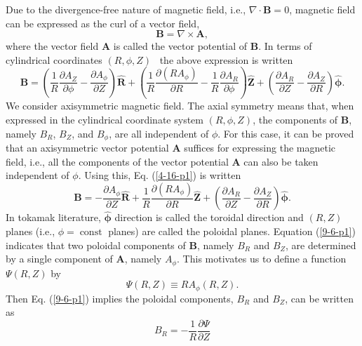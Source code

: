\documentclass{article}
\newcommand{\tmmathbf}[1]{\ensuremath{\boldsymbol{#1}}}
\newcommand{\tmop}[1]{\ensuremath{\operatorname{#1}}}
\begin{document}
Due to the divergence-free nature of magnetic field, i.e., $\nabla \cdot
\mathbf{B}= 0$, magnetic field can be expressed as the curl of a vector field,
\begin{equation}
  \mathbf{B}= \nabla \times \mathbf{A},
\end{equation}
where the vector field $\mathbf{A}$ is called the vector potential of
$\mathbf{B}$. In terms of cylindrical coordinates $(R, \phi, Z)$ \ the above
expression is written
\begin{equation}
  \label{4-16-p1} \mathbf{B}= \left( \frac{1}{R} \frac{\partial A_Z}{\partial
  \phi} - \frac{\partial A_{\phi}}{\partial Z} \right) \hat{\mathbf{R}} +
  \left( \frac{1}{R} \frac{\partial (R A_{\phi})}{\partial R} - \frac{1}{R}
  \frac{\partial A_R}{\partial \phi} \right) \hat{\mathbf{Z}} + \left(
  \frac{\partial A_R}{\partial Z} - \frac{\partial A_Z}{\partial R} \right)
  \hat{\tmmathbf{\phi}} .
\end{equation}
We consider axisymmetric magnetic field. The axial symmetry means that, when
expressed in the cylindrical coordinate system $(R, \phi, Z)$, the components
of $\mathbf{B}$, namely $B_R$, $B_Z$, and $B_{\phi}$, are all independent of
$\phi$. For this case, it can be proved that an axisymmetric vector potential
$\mathbf{A}$ suffices for expressing the magnetic field, i.e., all the
components of the vector potential $\mathbf{A}$ can also be taken independent
of $\phi$. Using this, Eq. (\ref{4-16-p1}) is written
\begin{equation}
  \label{9-6-p1} \mathbf{B}= - \frac{\partial A_{\phi}}{\partial Z}
  \hat{\mathbf{R}} + \frac{1}{R} \frac{\partial (R A_{\phi})}{\partial R}
  \hat{\mathbf{Z}} + \left( \frac{\partial A_R}{\partial Z} - \frac{\partial
  A_Z}{\partial R} \right) \hat{\tmmathbf{\phi}} .
\end{equation}
In tokamak literature, $\hat{\tmmathbf{\phi}}$ direction is called the
toroidal direction and $(R, Z)$ planes (i.e., $\phi = \tmop{const}$ planes)
are called the poloidal planes. Equation (\ref{9-6-p1}) indicates that two
poloidal components of $\mathbf{B}$, namely $B_R$ and $B_Z$, are determined by
a single component of $\mathbf{A}$, namely $A_{\phi}$. This motivates us to
define a function $\Psi (R, Z)$ by
\begin{equation}
  \label{2-14-1} \Psi (R, Z) \equiv R A_{\phi} (R, Z) .
\end{equation}
Then Eq. (\ref{9-6-p1}) implies the poloidal components, $B_R$ and $B_Z$, can
be written as
\begin{equation}
  \label{7-14-p1} B_R = - \frac{1}{R} \frac{\partial \Psi}{\partial Z}
\end{equation}
\end{document}
